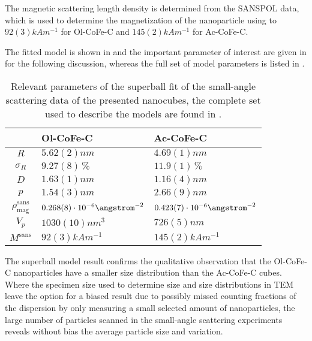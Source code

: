 \documentclass[\main/dresen_thesis.tex]{subfiles}
\begin{document}
    The magnetic scattering length density is determined from the SANSPOL data, which is used to determine the magnetization of the nanoparticle using  to $92(3) \unit{kAm^{-1}}$ for Ol-CoFe-C and $145(2) \unit{kAm^{-1}}$ for Ac-CoFe-C.

    The fitted model is shown in  and the important parameter of interest are given in  for the following discussion, whereas the full set of model parameters is listed in .
    \begin{table}[ht]
      \centering
      \caption{\label{tab:monolayers:nanoparticle:sas}Relevant parameters of the superball fit of the small-angle scattering data of the presented nanocubes, the complete set used to describe the models are found in .}
      \begin{tabular}{ c | l | l }
          & Ol-CoFe-C & Ac-CoFe-C \\
        \hline
        $R$
          & $5.62(2) \unit{nm}$
          & $4.69(1) \unit{nm}$\\
        $\sigma_R$
          & $9.27(8) \,\%$
          & $11.9(1) \,\%$\\
        $D$
          & $1.63(1) \unit{nm}$
          & $1.16(4) \unit{nm}$\\
        $p$
          & $1.54(3) \unit{nm}$
          & $2.66(9) \unit{nm}$\\
        $\rho_\mathrm{mag}^\mathrm{sans}$
          & $0.268(8) \cdot 10^{-6} \angstrom^{-2}$
          & $0.423(7) \cdot 10^{-6} \angstrom^{-2}$\\
        \hline
        $V_p$
          & $1030(10) \unit{nm^3}$
          & $726(5) \unit{nm}$\\
        $M^\mathrm{sans}$
          & $92(3) \unit{kAm^{-1}}$
          & $145(2) \unit{kAm^{-1}}$\\
        \hline
      \end{tabular}
    \end{table}
    The superball model result confirms the qualitative observation that the Ol-CoFe-C nanoparticles have a smaller size distribution than the Ac-CoFe-C cubes.
    Where the specimen size used to determine size and size distributions in TEM leave the option for a biased result due to possibly missed counting fractions of the dispersion by only measuring a small selected amount of nanoparticles, the large number of particles scanned in the small-angle scattering experiments reveals without bias the average particle size and variation.
\end{document}
